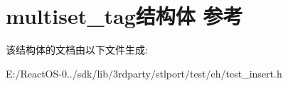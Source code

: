 \hypertarget{structmultiset__tag}{}\section{multiset\+\_\+tag结构体 参考}
\label{structmultiset__tag}


该结构体的文档由以下文件生成\+:\begin{DoxyCompactItemize}
\item 
E\+:/\+React\+O\+S-\/0../sdk/lib/3rdparty/stlport/test/eh/test\+\_\+insert.\+h\end{DoxyCompactItemize}
